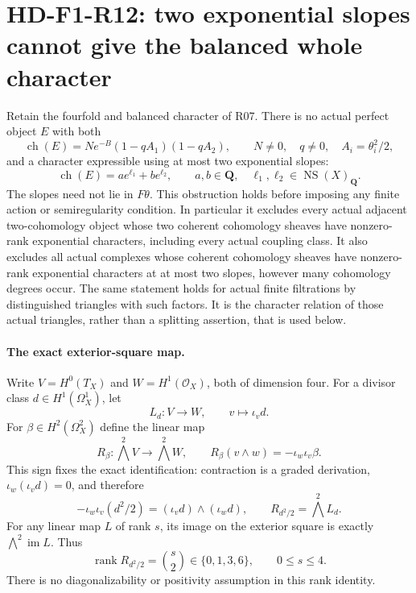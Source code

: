 \section[HD-F1-R12: the two-slope whole-character obstruction]{HD-F1-R12: two exponential slopes cannot give the balanced whole character}
\label{sec:followup-rm-two-slope}

Retain the fourfold and balanced character of R07. There is no
actual perfect object $E$ with both
\[
 \operatorname{ch}(E)=N e^{-B}(1-qA_1)(1-qA_2),\qquad
 N\ne0,\quad q\ne0,\quad A_i=\theta_i^2/2,
 \tag{F1R12.1}
\]
and a character expressible using at most two exponential slopes:
\[
             \operatorname{ch}(E)=a e^{\ell_1}+b e^{\ell_2},
 \qquad a,b\in\mathbf Q,\quad
             \ell_1,\ell_2\in\operatorname{NS}(X)_{\mathbf Q}.
 \tag{F1R12.2}
\]
The slopes need not lie in $F\theta$. This obstruction holds
before imposing any finite action or semiregularity condition.
In particular it excludes every actual adjacent two-cohomology
object whose two coherent cohomology sheaves have nonzero-rank
exponential characters, including every actual coupling class.
It also excludes all actual complexes whose coherent cohomology
sheaves have nonzero-rank exponential characters at at most two
slopes, however many cohomology degrees occur. The same statement
holds for actual finite filtrations by distinguished triangles
with such factors. It is the character relation of those actual
triangles, rather than a splitting assertion, that is used below.

\paragraph{The exact exterior-square map.}
Write $V=H^0(T_X)$ and $W=H^1(\mathcal O_X)$, both of
dimension four. For a divisor class $d\in H^1(\Omega_X^1)$,
let
\[
 L_d:V\longrightarrow W,\qquad v\longmapsto\iota_vd.
 \tag{F1R12.3}
\]
For $\beta\in H^2(\Omega_X^2)$ define the linear map
\[
 R_\beta:\bigwedge^2V\longrightarrow\bigwedge^2W,
 \qquad R_\beta(v\wedge w)=-\iota_w\iota_v\beta.
 \tag{F1R12.4}
\]
This sign fixes the exact identification: contraction is a
graded derivation, $\iota_w(\iota_vd)=0$, and therefore
\[
 -\iota_w\iota_v(d^2/2)
       =(\iota_vd)\wedge(\iota_wd),\qquad
                  R_{d^2/2}=\bigwedge^2L_d.
 \tag{F1R12.5}
\]
For any linear map $L$ of rank $s$, its image on the exterior
square is exactly $\bigwedge^2\operatorname{im}L$. Thus
\[
 \operatorname{rank}R_{d^2/2}=\binom{s}{2}
                    \in\{0,1,3,6\},\qquad 0\le s\le4.
 \tag{F1R12.6}
\]
There is no diagonalizability or positivity assumption in this
rank identity.

